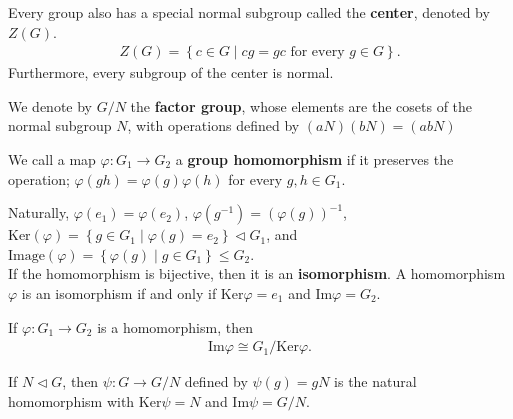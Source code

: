 \documentclass{memoir}
\begin{document}
Every group also has a special normal subgroup called the \textbf{center}, denoted by \(Z(G)\).
\begin{align*}
	Z(G) = \left\{c \in G \mid cg = gc \text{ for every }g \in G \right\} .
\end{align*}
Furthermore, every subgroup of the center is normal.

\begin{defn}
	We denote by \(G / N\) the \textbf{factor group}, whose elements are the cosets of the normal subgroup \(N\), with operations defined by \((aN)(bN) = (abN)\)
\end{defn}
\begin{defn}
	We call a map \(\varphi:G_1\to G_2\) a \textbf{group homomorphism} if it preserves the operation; \(\varphi(gh) = \varphi(g)\varphi(h)\) for every \(g,h \in G_1\).
\end{defn}
Naturally, \(\varphi(e_1) = \varphi(e_2)\), \(\varphi(g^{-1}) = (\varphi(g))^{-1}\), \( \textrm{Ker}(\varphi) = \left\{g \in G_1 \mid \varphi(g) = e_2 \right\} \triangleleft G_1\), and \( \textrm{Image}(\varphi) = \left\{\varphi(g) \mid g \in G_1 \right\} \leq G_2\).\\

If the homomorphism is bijective, then it is an \textbf{isomorphism}. A homomorphism \(\varphi\) is an isomorphism if and only if \( \textrm{Ker}\varphi = e_1\) and \( \textrm{Im}\varphi = G_2\).
\begin{thm}
If \(\varphi:G_1\to G_2\) is a homomorphism, then
\begin{align*}
	\textrm{Im}\varphi \cong G_1 / \textrm{Ker}\varphi.
\end{align*}
\end{thm}
\begin{defn}
	If \(N \triangleleft G\), then \(\psi:G \to G / N\) defined by \(\psi(g) = gN\) is the natural homomorphism with \( \textrm{Ker}\psi = N\) and \( \textrm{Im}\psi = G / N\).
\end{defn}
\end{document}
